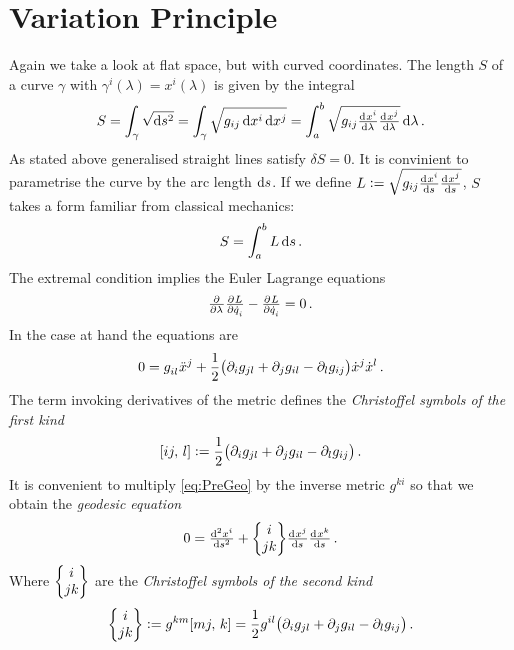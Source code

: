 \section{Variation Principle}
Again we take a look at flat space, but with curved coordinates.
The length $S$ of a curve $\gamma$ with $\gamma^i(\lambda) = x^i(\lambda)$ is
given by the integral
\begin{equation}
    S=\int_{\gamma}\sqrt{\dif s^2} =
    \int_{\gamma}\sqrt{g_{ij}\dif x^i\dif x^j}=\int_{a}^{b}\sqrt{g_{ij}\od{x^i}{\lambda} \od{x^j}{\lambda}}\dif \lambda\, .
\end{equation}
As stated above generalised straight lines satisfy $\delta S = 0$. It is
convinient to parametrise the curve by the arc length $\dif s$. If we define
$L:=\sqrt{g_{ij}\od{x^i}{s} \od{x^j}{s}}$, $S$ takes a form
familiar from classical mechanics:
\begin{equation}
    S=\int_a^b L\dif s\, .
\end{equation}
The extremal condition implies the Euler Lagrange equations
\begin{equation}
    \pd{}{\lambda}\pd{L}{\dot{q}_i}-\pd{L}{\dot{q}_i}
=0\, .		\end{equation}
In the case at hand the equations are
\begin{equation}
    0=\tensor{g}{_i_l}\tensor{\ddot{x}}{^j}+\frac{1}{2} \left(\partial_i g_{jl} + \partial_j g_{il} -
    \partial_l g_{ij}\right)\dot{x}^j\dot{x}^l\, . \label{eq:PreGeo}
\end{equation}
The term invoking derivatives of the metric defines the \emph{Christoffel
symbols of the first kind}
\begin{equation}
    \csym{i}{j}{l}:=\frac{1}{2} \left(\partial_i g_{jl} + \partial_j g_{il} -
    \partial_l g_{ij}\right)\, .
\end{equation}
It is convenient to multiply \eqref{eq:PreGeo} by the inverse metric $g^{ki}$ so that we obtain the \emph{geodesic equation}
\begin{equation}
    0 = \od[2]{x^i}{s}+\cSym{i}{j}{k}\od{x^j}{s}\od{x^k}{s}\, .
\end{equation}
Where $\begin{Bmatrix} i \\ j k \end{Bmatrix}$ are the \emph{Christoffel symbols of the second kind}
\begin{equation}
    \cSym{i}{j}{k}:=g^{km}\csym{m}{j}{k}=\frac{1}{2}g^{il}\left(\partial_i
    g_{jl} + \partial_j g_{il} - \partial_l g_{ij}\right)\, .
\end{equation}
